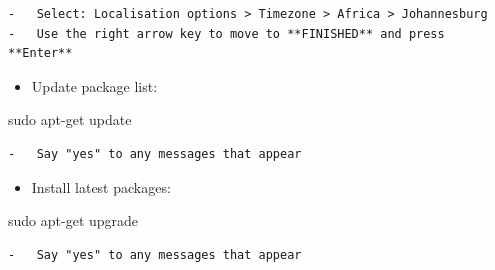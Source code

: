 \documentclass[
  letterpaper,
]{scrbook}
\newenvironment{Shaded}{\begin{snugshade}}{\end{snugshade}}
\newcommand{\FunctionTok}[1]{\textcolor[rgb]{0.28,0.35,0.67}{#1}}
\newcommand{\NormalTok}[1]{\textcolor[rgb]{0.00,0.23,0.31}{#1}}
\providecommand{\tightlist}{%
  \setlength{\itemsep}{0pt}\setlength{\parskip}{0pt}}
\begin{document}
\begin{verbatim}
-   Select: Localisation options > Timezone > Africa > Johannesburg
-   Use the right arrow key to move to **FINISHED** and press **Enter**
\end{verbatim}

\begin{itemize}
\tightlist
\item
  Update package list:
\end{itemize}

\begin{Shaded}
\begin{Highlighting}[]
\FunctionTok{sudo}\NormalTok{ apt{-}get update}
\end{Highlighting}
\end{Shaded}

\begin{verbatim}
-   Say "yes" to any messages that appear
\end{verbatim}

\begin{itemize}
\tightlist
\item
  Install latest packages:
\end{itemize}

\begin{Shaded}
\begin{Highlighting}[]
\FunctionTok{sudo}\NormalTok{ apt{-}get upgrade}
\end{Highlighting}
\end{Shaded}

\begin{verbatim}
-   Say "yes" to any messages that appear
\end{verbatim}
\end{document}
